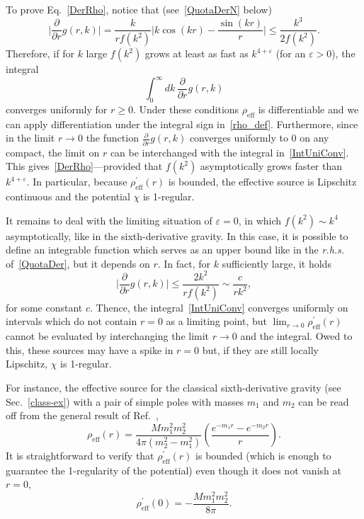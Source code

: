 \documentclass[aps,prd,a4paper,twocolumn,showpacs,showkeys,preprintnumbers,amsmath,amssymb,nofootinbib]{revtex4-2}
\numberwithin{equation}{section}
\def\beq{\begin{equation}}
\def\eeq{\end{equation}}
\def\pa{\partial}
\begin{document}
To prove Eq.~\eqref{DerRho}, notice that (see~\eqref{QuotaDerN} below)
\begin{equation} \label{QuotaDer}
\bigg\vert \frac{\pa}{\pa r}g(r,k) \bigg\vert = \frac{k}{r f(k^2)} \bigg\vert k \cos(kr) - \frac{\sin(kr)}{r} \bigg\vert \leqslant \frac{k^3}{2f(k^2)}.
\end{equation}
Therefore, if for $k$ large $f(k^2)$ grows at least as fast as $k^{4+\varepsilon}$ (for an $\varepsilon>0$), the  integral
\begin{equation} \label{IntUniConv}
\int_{0}^{\infty} dk \, \frac{\pa}{\pa r}g(r,k)
\end{equation}
converges uniformly for $r \geqslant 0$. Under these conditions $\rho_\text{eff}$ is differentiable and we can apply differentiation under the integral sign in~\eqref{rho_def}. Furthermore, since in the limit $r \to 0$ the function $\tfrac{\pa}{\pa r}g(r,k)$ converges uniformly to $0$ on any compact, the limit on $r$ can be interchanged with the integral in~\eqref{IntUniConv}. This gives~\eqref{DerRho}---provided that $f(k^2)$ asymptotically grows faster than $k^{4+\varepsilon}$. In particular, because $\rho_\text{eff}^\prime (r)$ is bounded, the effective source is Lipschitz continuous and the potential $\chi$ is 1-regular.

It remains to deal with the limiting situation of $\varepsilon = 0$, in which $f(k^2) \sim k^4$ asymptotically, like in  the sixth-derivative gravity. In this case, it is possible to define an integrable function which serves as an upper bound like in the \textit{r.h.s.} of~\eqref{QuotaDer}, but it depends on $r$. In fact, for $k$ sufficiently large, it holds
\begin{equation} \label{QuotaDer4th}
\bigg\vert \frac{\pa}{\pa r}g(r,k) \bigg\vert \leqslant \frac{2k^2}{r f(k^2)} \sim \frac{c}{r k^2} ,
\end{equation}
for some constant $c$.
Thence, the integral~\eqref{IntUniConv} converges uniformly on intervals which do not contain $r = 0$ as a limiting point, but $\lim_{r\to 0}\rho_\text{eff}^\prime(r)$ cannot be evaluated by interchanging the limit $r\to 0$ and the integral. Owed to this, these sources may have a spike in $r=0$ but, if they are still locally Lipschitz, $\chi$ is 1-regular.

For instance, the effective source for the classical sixth-derivative gravity (see Sec.~\ref{class-ex}) with a pair of simple poles with masses $m_1$ and $m_2$ can be read off from the general result of Ref.~\cite{BreTib2},
\beq
\rho_\text{eff}(r) = \frac{M m_1^2 m_2^2}{4\pi (m_2^2 - m_1^2)} \left( \frac{e^{-m_1 r} - e^{-m_2 r}}{r} \right) .
\eeq
It is straightforward to verify that $\rho_\text{eff}^\prime (r)$ is bounded (which is enough to guarantee the 1-regularity of the potential) even though it does not vanish at $r=0$,
\beq
\rho_\text{eff}^\prime(0) = - \frac{M m_1^2 m_2^2}{8\pi}.
\eeq
\end{document}
